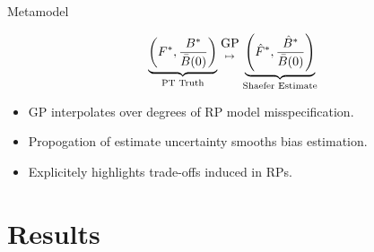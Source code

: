 \documentclass[ xcolor = pdftex, dvipsnames, table ]{beamer}
\begin{document}
\begin{frame}
{
}
\end{frame}

%
\begin{frame}{Metamodel}

\begin{equation*}
\underbrace{\left(F^*, \frac{B^*}{\bar B(0)}\right)}_{\text{PT Truth}} {\text{GP}\atop{\mapsto\atop~}} \underbrace{\left(\hat F^*, \frac{\hat B^*}{\bar B(0)}\right)}_{\text{Shaefer Estimate}}
\end{equation*}

\begin{itemize}
\item GP interpolates over degrees of RP model misspecification.
\item Propogation of estimate uncertainty smooths bias estimation.
\item Explicitely highlights trade-offs induced in RPs.
\end{itemize}
%
\end{frame}

%
\section{Results}
\end{document}
